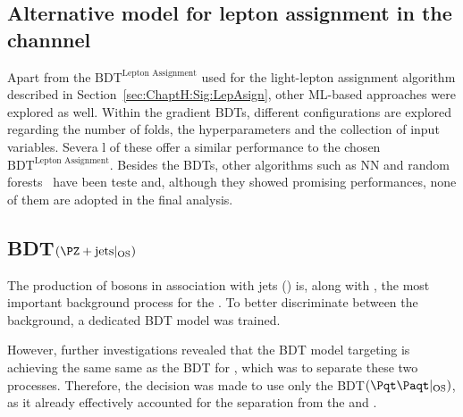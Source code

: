 \subsection{Alternative model for lepton assignment in the \dilepSStau channnel}
\label{sec:BDT:AltModels:Assignment}
Apart from the $\text{BDT}^{\text{Lepton Assignment}}$ used for the light-lepton assignment algorithm
described in Section~\ref{sec:ChaptH:Sig:LepAsign}, other ML-based approaches were explored
as well.  
Within the gradient BDTs, different configurations are explored regarding the number of folds, the hyperparameters
and the collection of input variables. Severa l of these offer a similar performance to the chosen $\text{BDT}^{\text{Lepton Assignment}}$.
Besides the BDTs, other algorithms such as NN and random forests~\cite{ho1995random} have been teste and, although they showed
promising performances, none of them are adopted in the final analysis.



\subsection{BDT$(\PZ+\text{jets}|_{\text{OS}})$}
\label{sec:BDT:AltModels:ZjetsOS}
The production of \PZ bosons in association with jets (\Zjets) is, along with \ttbar, the most important background process for the \dilepOStau. 
To better discriminate between the \Zjets background, %
a dedicated BDT model was trained. 

However, further investigations revealed that the BDT model targeting \ttbar is achieving the same
same as the BDT for \Zjets, which was to separate these two processes. Therefore, the decision was 
made to use only the BDT$(\ttbar|_{\text{OS}})$, as it already effectively accounted for the separation from the \Zjets and \ttbar.

